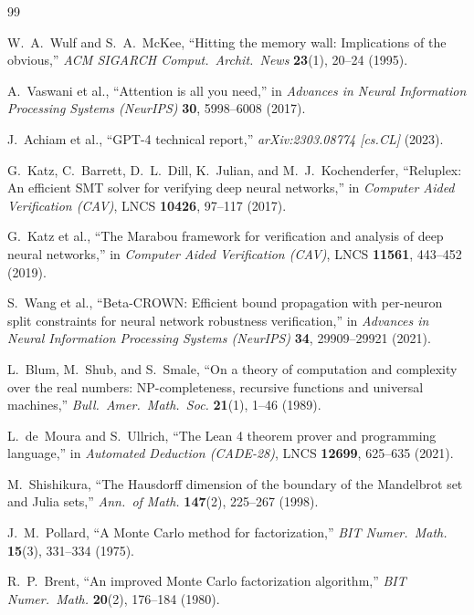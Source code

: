 \documentclass[10pt,a4paper]{article}
\begin{document}
\begin{thebibliography}{99}
\small
\setlength{\itemsep}{1.5pt}

 W.~A.~Wulf and S.~A.~McKee, ``Hitting the memory wall: Implications of the obvious,'' \emph{ACM SIGARCH Comput.\ Archit.\ News} \textbf{23}(1), 20--24 (1995).

 A.~Vaswani et al., ``Attention is all you need,'' in \emph{Advances in Neural Information Processing Systems (NeurIPS)} \textbf{30}, 5998--6008 (2017).

 J.~Achiam et al., ``GPT-4 technical report,'' \emph{arXiv:2303.08774 [cs.CL]} (2023).

 G.~Katz, C.~Barrett, D.~L.~Dill, K.~Julian, and M.~J.~Kochenderfer, ``Reluplex: An efficient SMT solver for verifying deep neural networks,'' in \emph{Computer Aided Verification (CAV)}, LNCS \textbf{10426}, 97--117 (2017).

 G.~Katz et al., ``The Marabou framework for verification and analysis of deep neural networks,'' in \emph{Computer Aided Verification (CAV)}, LNCS \textbf{11561}, 443--452 (2019).

 S.~Wang et al., ``Beta-CROWN: Efficient bound propagation with per-neuron split constraints for neural network robustness verification,'' in \emph{Advances in Neural Information Processing Systems (NeurIPS)} \textbf{34}, 29909--29921 (2021).

 L.~Blum, M.~Shub, and S.~Smale, ``On a theory of computation and complexity over the real numbers: NP-completeness, recursive functions and universal machines,'' \emph{Bull.\ Amer.\ Math.\ Soc.} \textbf{21}(1), 1--46 (1989).

 L.~de~Moura and S.~Ullrich, ``The Lean 4 theorem prover and programming language,'' in \emph{Automated Deduction (CADE-28)}, LNCS \textbf{12699}, 625--635 (2021).

 M.~Shishikura, ``The Hausdorff dimension of the boundary of the Mandelbrot set and Julia sets,'' \emph{Ann.\ of Math.} \textbf{147}(2), 225--267 (1998).

 J.~M.~Pollard, ``A Monte Carlo method for factorization,'' \emph{BIT Numer.\ Math.} \textbf{15}(3), 331--334 (1975).

 R.~P.~Brent, ``An improved Monte Carlo factorization algorithm,'' \emph{BIT Numer.\ Math.} \textbf{20}(2), 176--184 (1980).


\end{thebibliography}
\end{document}
